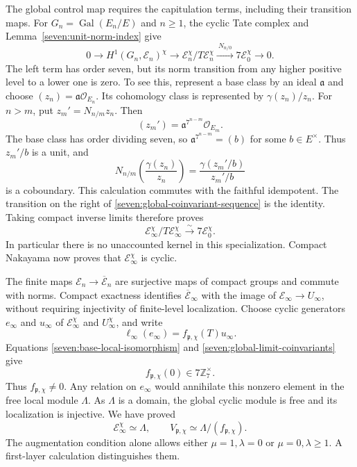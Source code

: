\documentclass[11pt]{article}
\begin{document}
The global control map requires the capitulation terms, including
their transition maps.
For $G_n=\operatorname{Gal}(E_n/E)$ and $n\ge1$, the cyclic Tate
complex and Lemma~\ref{seven:unit-norm-index} give
\begin{equation*}\tag{U7}\label{seven:global-coinvariant-sequence}
 0\longrightarrow H^1(G_n,\mathcal E_n)^\chi
 \longrightarrow\mathcal E_n^\chi/T\mathcal E_n^\chi
 \xrightarrow{\ N_{n/0}\ }7\mathcal E_0^\chi
 \longrightarrow0.
\end{equation*}
The left term has order seven, but its norm transition from any higher
positive level to a lower one is zero. To see this, represent a base
class by an ideal $\mathfrak a$ and choose
$(z_n)=\mathfrak a\mathcal O_{E_n}$. Its cohomology class is represented
by $\gamma(z_n)/z_n$. For $n>m$, put $z_m'=N_{n/m}z_n$.
Then
\[
 (z_m')=\mathfrak a^{7^{n-m}}\mathcal O_{E_m}.
\]
The base class has order dividing seven, so
$\mathfrak a^{7^{n-m}}=(b)$ for some $b\in E^\times$.
Thus $z_m'/b$ is a unit, and
\[
 N_{n/m}\!\left(\frac{\gamma(z_n)}{z_n}\right)
 =\frac{\gamma(z_m'/b)}{z_m'/b}
\]
is a coboundary. This calculation commutes with the faithful
idempotent. The transition on the right of
\eqref{seven:global-coinvariant-sequence} is the identity.
Taking compact inverse limits therefore proves
\begin{equation*}\tag{U8}\label{seven:global-limit-coinvariants}
 \mathcal E_\infty^\chi/T\mathcal E_\infty^\chi
 \xrightarrow{\ \sim\ }7\mathcal E_0^\chi.
\end{equation*}
In particular there is no unaccounted kernel in this specialization.
Compact Nakayama now proves that $\mathcal E_\infty^\chi$ is cyclic.

The finite maps $\mathcal E_n\to\overline{\mathcal E}_n$ are surjective
maps of compact groups and commute with norms. Compact exactness
identifies $\overline{\mathcal E}_\infty$ with the image of
$\mathcal E_\infty\to U_\infty$, without requiring injectivity of
finite-level localization. Choose cyclic generators $e_\infty$ and
$u_\infty$ of $\mathcal E_\infty^\chi$ and $U_\infty^\chi$, and write
\[
 \ell_\infty(e_\infty)=f_{\mathfrak p,\chi}(T)u_\infty.
\]
Equations \eqref{seven:base-local-isomorphism} and
\eqref{seven:global-limit-coinvariants} give
\begin{equation*}\tag{U9}\label{seven:unit-factor-augmentation}
 f_{\mathfrak p,\chi}(0)\in7\mathbb Z_7^\times.
\end{equation*}
Thus $f_{\mathfrak p,\chi}\ne0$. Any relation on $e_\infty$ would
annihilate this nonzero element in the free local module $\Lambda$.
As $\Lambda$ is a domain, the global cyclic module is free and its
localization is injective. We have proved
\begin{equation*}\tag{U10}\label{seven:unit-factor}
 \mathcal E_\infty^\chi\simeq\Lambda,\qquad
 V_{\mathfrak p,\chi}\simeq\Lambda/(f_{\mathfrak p,\chi}).
\end{equation*}
The augmentation condition alone allows either $\mu=1,\lambda=0$
or $\mu=0,\lambda\ge1$. A first-layer calculation distinguishes them.
\end{document}
